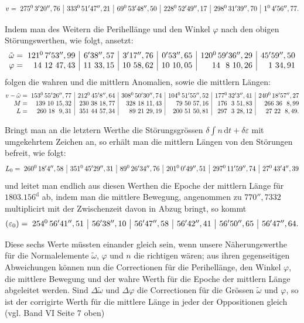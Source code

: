 \begin{landscape}
\[\begin{array}{@{}r@{\;}r|r|r|r|r|r@{}}
v={}&275^{0}\,3'20'',76 & 333^{0}\,51'47'',21 & 69^{0}\,53'48'',50 & 228^{0}\,52'49'',17 & 298^{0}\,31'39'',70 & 1^{0}\,4'56'',77.
\end{array}\]
\par
Indem man des Weitern die Perihellänge und den Winkel \(\varphi\) nach den obigen Störungswerthen, wie folgt, ansetzt:
\[\begin{array}{@{}r@{\;}r|r|r|r|r|r@{}}
\tilde\omega={}&121^{0}\,7'53'',99 & 6'38'',57 & 3'17'',76 & 0'53'',65 & 120^{0}\,59'36'',29 & 45'59'',50
\\
\varphi={}&14\ 12\ 47,43 & 11\ 33,15 & 10\ 58,62 & 10\ 10,05 & 14\ \ 8\ 10,26 & 1\ 34,91
\end{array}\]
folgen die wahren und die mittlern Anomalien, sowie die mittlern Längen:
\[\begin{array}{@{}r@{\;}r|r|r|r|r|r@{}}
v-\tilde\omega={}&153^{0}\,55'26'',77 & 212^{0}\,45'8'',64 & 308^{0}\,50'30'',74 & 104^{0}\,51'55'',52 & 177^{0}\,32'3'',41 & 240^{0}\,18'57'',27
\\
M={}&139\ 10\ 15,32 & 230\ 38\ 18,77 & 328\ 18\ 11,43 & 79\ 50\ 57,16 & 176\ \ 3\ 51,83 & 266\ 36\ \ 8,99
\\
L={}&260\ 18\ \ 9,31 & 351\ 44\ 57,34 & 89\ 21\ 29,19 & 200\ 51\ 50,81 & 297\ \ 3\ 28,12 & 27\ 22\ \ 8,49.
\end{array}\]
\par
Bringt man an die letztern Werthe die Störungsgrössen \(\delta\int n\,\mathrm{d}t+\delta\varepsilon\) mit umgekehrtem Zeichen an, so erhält man die mittlern Längen von den Störungen befreit, wie folgt:
\[\begin{array}{@{}r@{\;}r|r|r|r|r|r@{}}
L_0={}&260^{0}\,18'4'',58 & 351^{0}\,45'29'',31 & 89^{0}\,26'34'',76 & 201^{0}\,0'49'',51 & 297^{0}\,11'59'',74 & 27^{0}\,43'4'',39
\end{array}\]
und leitet man endlich aus diesen Werthen die Epoche der mittlern Länge für \(1803.156^{\mathrm d}\) ab, indem man die mittlere Bewegung, angenommen zu \(770'',7332\) multiplicirt mit der Zwischenzeit davon in Abzug bringt, so kommt
\[\begin{array}{@{}r@{\;}r|r|r|r|r|r@{}}
(\varepsilon_0)={}&254^{0}\,56'41'',51 & 56'38'',10 & 56'47'',58 & 56'42'',41 & 56'50'',65 & 56'47'',64.
\end{array}\]
\par
{}Diese sechs Werte müssten einander gleich sein, wenn unsere Näherungswerthe für die Normalelemente \(\tilde\omega\), \(\varphi\) und \(n\) die richtigen wären; aus ihren gegenseitigen Abweichungen können nun die Correctionen für die Perihellänge, den Winkel \(\varphi\), die mittlere Bewegung und der wahre Werth für die Epoche der mittlern Länge abgeleitet werden. Sind \(\Delta\tilde\omega\) und \(\Delta\varphi\) die Correctionen für die Grössen \(\tilde\omega\) und \(\varphi\), so ist der corrigirte Werth für die mittlere Länge in jeder der Oppositionen gleich (vgl. Band VI Seite 7 oben)

\end{landscape}
